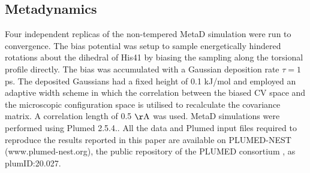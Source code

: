 \subsection*{Metadynamics}
Four independent replicas of the non-tempered MetaD simulation were run to convergence.\cite{metaD} The bias potential was setup to sample energetically hindered rotations about the \dihtwo dihedral of His41 by biasing the sampling along the \dihone torsional profile directly. The bias was accumulated with a Gaussian deposition rate $\tau = 1$ ps. The deposited Gaussians had a fixed height of 0.1 kJ/mol and employed an adaptive width scheme in which the correlation between the biased CV space and the microscopic configuration space is utilised to recalculate the covariance matrix. A correlation length of 0.5 $\mathrm{\AA}$ was used.\cite{adaptive} MetaD simulations were performed using Plumed 2.5.4.\cite{plumed}. All the data and Plumed input files required to reproduce the results reported in this paper are available on PLUMED-NEST (www.plumed-nest.org), the public repository of the PLUMED consortium \cite{plumed}, as plumID:20.027. 